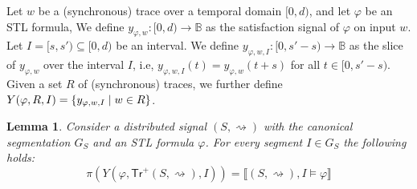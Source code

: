 \documentclass[iicol,lineno]{sn-jnl}
\newcommand{\hb}{\rightsquigarrow}
\newcommand{\tr}{\mathsf{Tr}}
\newcommand{\B}{\mathbb{B}}
\newcommand{\?}{\text{?}}
\newcommand{\suchthat}{\;\ifnum\currentgrouptype=16 \middle\fi|\;}
\let\st\suchthat
\newtheorem{lemma}{Lemma}
\begin{document}
	Let $w$ be a (synchronous) trace over a temporal domain $[0,d)$, and let $\varphi$ be an STL formula,
	We define $y_{\varphi,w} : [0,d) \to \B$ as the satisfaction signal of $\varphi$ on input $w$.
	Let $I = [s, s') \subseteq [0,d)$ be an interval.
	We define $y_{\varphi,w,I} : [0, s' - s) \to \B$ as the slice of $y_{\varphi,w}$ over the interval $I$, i.e, $y_{\varphi,w,I}(t) = y_{\varphi,w}(t + s)$ for all $t \in [0, s' - s)$.
	Given a set  $R$ of (synchronous) traces, we further define $Y(\varphi, R, I) = \{ y_{\varphi,w,I} \st w \in R \}$.
	
	\begin{lemma} \label{cl:eq}
		Consider a distributed signal $(S,{\hb})$ with the canonical segmentation $G_S$ and an STL formula $\varphi$.
		For every segment $I \in G_S$ the following holds:
		\[ \pi(Y(\varphi, \tr^+(S,{\hb}), I)) = \llbracket (S,{\hb}), I \models \varphi \rrbracket \]
	\end{lemma}
\end{document}
